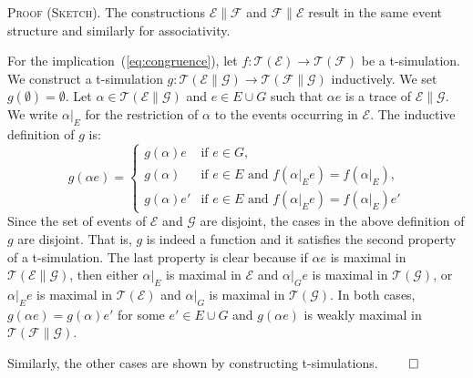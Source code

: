 \documentclass[review]{elsart}
\newenvironment{proofsummary}{\par
\noindent
\textsc{Proof (Sketch). }
\noindent}{\hfill\(\qed\)}
\newcommand{\EE}{\mathcal{E}}
\newcommand{\FF}{\mathcal{F}}
\newcommand{\GG}{\mathcal{G}}
\newcommand{\TT}{\mathcal{T}}
\begin{document}
\begin{proofsummary}
The constructions $\EE\|\FF$ and $\FF\|\EE$ result in the same event structure and similarly for associativity. 

For the implication~(\ref{eq:congruence}), let $f{:}\TT(\EE){\to}\TT(\FF)$ be a t-simulation. We construct a t-simulation $g{:}\TT(\EE\|\GG){\to}\TT(\FF\|\GG)$ inductively. We set $g(\emptyset) {=} \emptyset$. Let $\alpha{\in} \TT(\EE\|\GG)$ and $e{\in} E{\cup} G$ such that $\alpha e$ is a trace of $\EE\|\GG$. We write $\alpha|_E$ for the restriction of $\alpha$ to the events occurring in $\EE$. The inductive definition of $g$ is:
\begin{displaymath}
g(\alpha e) = \begin{cases}
g(\alpha)e & \textrm{if } e{\in} G,\\
g(\alpha) & \textrm {if } e{\in} E\textrm{ and } f(\alpha|_Ee) {=} f(\alpha|_E), \\
g(\alpha)e' & \textrm{if } e{\in} E\textrm{ and } f(\alpha|_Ee) {=} f(\alpha|_E)e'
\end{cases}
\end{displaymath}
Since the set of events of $\EE$ and $\GG$ are disjoint, the cases in the above definition of $g$ are disjoint. That is, $g$ is indeed a function and it satisfies the second property of a t-simulation. The last property is clear because if $\alpha e$ is maximal in $\TT(\EE\|\GG)$, then either $\alpha|_E$ is maximal in $\EE$ and $\alpha|_Ge$ is maximal in $\TT(\GG)$, or $\alpha|_Ee$ is maximal in $\TT(\EE)$ and $\alpha|_G$ is maximal in $\TT(\GG)$. In both cases, $g(\alpha e) {=} g(\alpha)e'$ for some $e'{\in} E{\cup} G$ and $g(\alpha e)$ is weakly maximal in $\TT(\FF\|\GG)$.

Similarly, the other cases are shown by constructing t-simulations.
\end{proofsummary}
\end{document}
